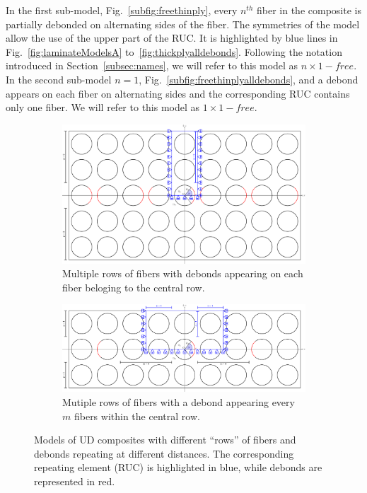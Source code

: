 \documentclass[review]{elsarticle}
\begin{document}
In the first sub-model, Fig.~\ref{subfig:freethinply}, every $n^{th}$ fiber in the composite is partially debonded on alternating sides of the fiber. The symmetries of the model allow the use of the upper part of the RUC. It is highlighted by blue lines in Fig.~\ref{fig:laminateModelsA} to~\ref{fig:thickplyalldebonds}. Following the notation introduced in Section~\ref{subsec:names}, we will refer to this model as $n\times 1-free$. In the second sub-model $n=1$, Fig.~\ref{subfig:freethinplyalldebonds}, and a debond appears on each fiber on alternating sides and the corresponding RUC contains only one fiber. We will refer to this model as $1\times 1-free$.

\begin{figure}[!h]
\centering
    \begin{subfigure}[b]{\textwidth}
    \centering
        \includegraphics[height=0.3\textheight]{thickPlycentraldebondsline.pdf}
        \caption{Multiple rows of fibers with debonds appearing on each fiber beloging to the central row.}\label{subfig:thickplycentraldebonds}
    \end{subfigure}

    \begin{subfigure}[b]{\textwidth}
        \includegraphics[width=\textwidth]{thickPly.pdf}
        \caption{Mutiple rows of fibers with a debond appearing every $m$ fibers within the central row.}\label{subfig:thickply}
    \end{subfigure}

\caption{Models of UD composites with different ``rows'' of fibers and debonds repeating at different distances. The corresponding repeating element (RUC) is highlighted in blue, while debonds are represented in red.}\label{fig:laminateModelsB}
\end{figure}
\end{document}
